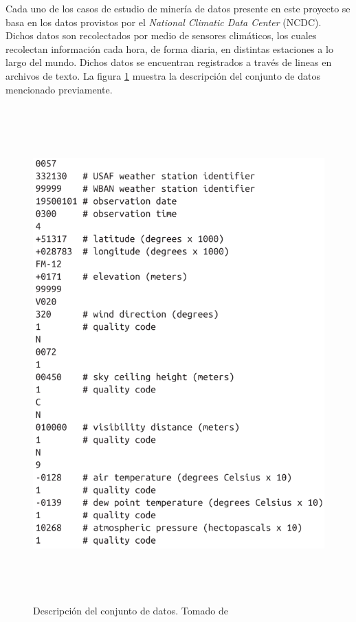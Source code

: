 Cada uno de los casos de estudio de minería de datos presente en este proyecto se basa en los datos provistos por el \textit{National Climatic Data Center} (NCDC). Dichos datos son recolectados por medio de sensores climáticos, los cuales recolectan información cada hora, de forma diaria, en distintas estaciones a lo largo del mundo. Dichos datos se encuentran registrados a través de lineas en archivos de texto. La figura \ref{dataset} muestra la descripción del conjunto de datos mencionado previamente. \\

\begin{figure}[H]
  \centering
      \includegraphics[width=5.0in, height=7.5in]{fig/dataset}
  \caption{Descripción del conjunto de datos. Tomado de \cite{White:2012:HDG:2285539}}
  \label{dataset}
\end{figure}

